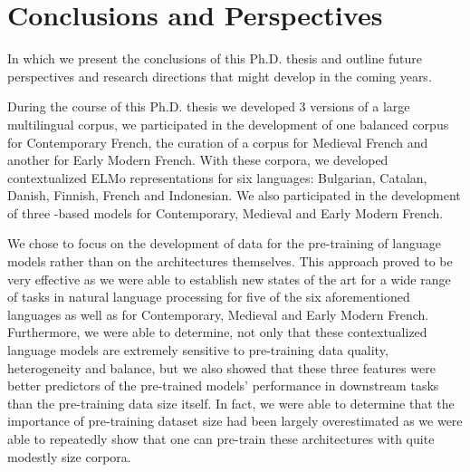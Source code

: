 \chapter{Conclusions and Perspectives}\label{chap:conclusions}

\begin{center}
    \begin{minipage}{0.66\textwidth}
        \begin{small}
            In which we present the conclusions of this Ph.D. thesis and outline future perspectives and research directions that might develop in the coming years.
        \end{small}
    \end{minipage}
    \vspace{0.5cm}
\end{center}

During the course of this Ph.D. thesis we developed 3 versions of a large multilingual corpus, we participated in the development of one balanced corpus for Contemporary French, the curation of a corpus for Medieval French and another for Early Modern French. With these corpora, we developed contextualized ELMo representations \citep{peters-etal-2018-deep} for six languages: Bulgarian, Catalan, Danish, Finnish, French and Indonesian. We also participated in the development of three \roberta-based \citep{liu-etal-2019-roberta} models for Contemporary, Medieval and Early Modern French. 

We chose to focus on the development of data for the pre-training of language models rather than on the architectures themselves. This approach proved to be very effective as we were able to establish new states of the art for a wide range of tasks in natural language processing for five of the six aforementioned languages as well as for Contemporary, Medieval and Early Modern French. Furthermore, we were able to determine, not only that these contextualized language models are extremely sensitive to pre-training data quality, heterogeneity and balance, but we also showed that these three features were better predictors of the pre-trained models' performance in downstream tasks than the pre-training data size itself. In fact, we were able to determine that the importance of pre-training dataset size had been largely overestimated \citep{martin-etal-2020-camembert} as we were able to repeatedly show that one can pre-train these architectures with quite modestly size corpora.

